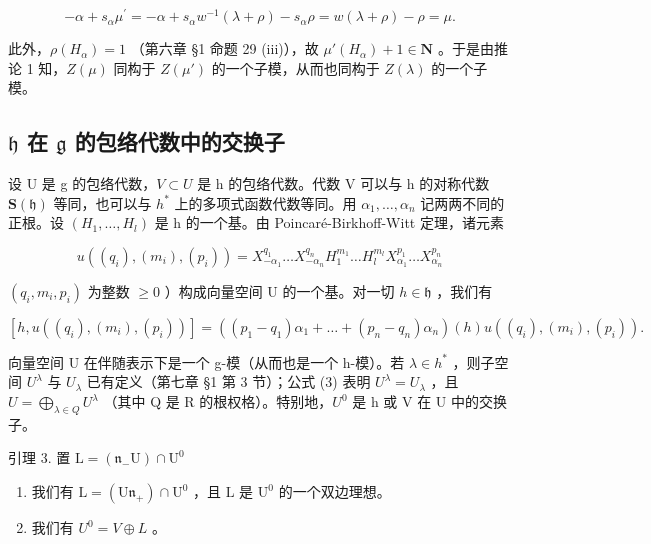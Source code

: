 \[
- \alpha + s _ {\alpha} \mu^ {\prime} = - \alpha + s _ {\alpha} w ^ {- 1} (\lambda + \rho) - s _ {\alpha} \rho = w (\lambda + \rho) - \rho = \mu .
\]

此外，\(\rho(H_{\alpha}) = 1\) （第六章 §1 命题 29 (iii)），故 \(\mu'(H_{\alpha}) + 1 \in \mathbf{N}\) 。于是由推论 1 知，\(Z(\mu)\) 同构于 \(Z(\mu')\) 的一个子模，从而也同构于 \(Z(\lambda)\) 的一个子模。

\subsection{\texorpdfstring{\(\mathfrak{h}\) 在 \(\mathfrak{g}\) 的包络代数中的交换子}{\textbackslash mathfrak\{h\} 在 \textbackslash mathfrak\{g\} 的包络代数中的交换子}}

设 U 是 g 的包络代数，\(V \subset U\) 是 h 的包络代数。代数 V 可以与 h 的对称代数 \(\mathbf{S}(\mathfrak{h})\) 等同，也可以与 \(h^{*}\) 上的多项式函数代数等同。用 \(\alpha_{1},\ldots,\alpha_{n}\) 记两两不同的正根。设 \((H_{1},\ldots,H_{l})\) 是 h 的一个基。由 Poincaré-Birkhoff-Witt 定理，诸元素

\[
u ((q _ {i}), (m _ {i}), (p _ {i})) = X _ {- \alpha_ {1}} ^ {q _ {1}} \dots X _ {- \alpha_ {n}} ^ {q _ {n}} H _ {1} ^ {m _ {1}} \dots H _ {l} ^ {m _ {l}} X _ {\alpha_ {1}} ^ {p _ {1}} \dots X _ {\alpha_ {n}} ^ {p _ {n}}
\]

\((q_{i},m_{i},p_{i})\) 为整数 \(\geq 0\) ）构成向量空间 U 的一个基。对一切 \(h\in \mathfrak{h}\) ，我们有

\[
[ h, u ((q _ {i}), (m _ {i}), (p _ {i})) ] = ((p _ {1} - q _ {1}) \alpha_ {1} + \dots + (p _ {n} - q _ {n}) \alpha_ {n}) (h) u ((q _ {i}), (m _ {i}), (p _ {i})).\tag{3}
\]

向量空间 U 在伴随表示下是一个 g-模（从而也是一个 h-模）。若 \(\lambda \in h^{*}\) ，则子空间 \(U^{\lambda}\) 与 \(U_{\lambda}\) 已有定义（第七章 §1 第 3 节）；公式 (3) 表明 \(U^{\lambda} = U_{\lambda}\) ，且 \(U = \bigoplus_{\lambda \in Q} U^{\lambda}\) （其中 Q 是 R 的根权格）。特别地，\(U^{0}\) 是 h 或 V 在 U 中的交换子。

引理 3. 置 \(\mathrm{L} = (\mathfrak{n}_{-}\mathrm{U})\cap \mathrm{U}^{0}\)

\begin{enumerate}
\def\labelenumi{(\roman{enumi})}
\item
  我们有 \(\mathrm{L} = (\mathrm{U}\mathfrak{n}_{+})\cap \mathrm{U}^{0}\) ，且 \(\mathrm{L}\) 是 \(\mathrm{U}^0\) 的一个双边理想。
\item
  我们有 \(U^{0} = V \oplus L\) 。
\end{enumerate}

